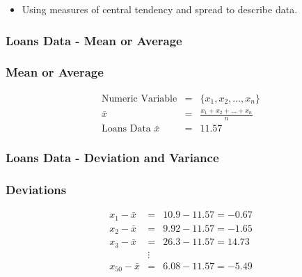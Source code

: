 \documentclass{beamer}
\begin{document}
\begin{frame}
  \begin{itemize}
    \item[] Using measures of central tendency and spread to describe
    data. 
  \end{itemize}
\end{frame}

\begin{frame}
  \frametitle{Loans Data - Mean or Average}
  \centering
\end{frame}

\begin{frame}
  \frametitle{Mean or Average}
  \begin{displaymath}
    \begin{array}{rcl}
      \text{Numeric Variable} & = & \{x_1, x_2, \ldots, x_n \} \\[2em]
      \bar{x} & = & \frac{x_1 + x_2 + \ldots + x_n}{n} \\[2em]
      \text{Loans Data } \bar{x} & = & 11.57 
    \end{array}
  \end{displaymath} 
\end{frame}

\begin{frame}
  \frametitle{Loans Data - Deviation and Variance}
  \centering
\end{frame}

\begin{frame}
  \frametitle{Deviations}
  \begin{displaymath}
    \begin{array}{rcl}
      x_1 - \bar{x} & = & 10.9 - 11.57 = -0.67 \\[0.3em]
      x_2 - \bar{x} & = & 9.92 - 11.57 = -1.65 \\[0.3em]
      x_3 - \bar{x} & = & 26.3 - 11.57 = 14.73 \\[0.3em]
      & \vdots & \\[0.3em]
      x_{50} - \bar{x} & = & 6.08 - 11.57 = -5.49 
    \end{array}
  \end{displaymath} 
\end{frame}
\end{document}

